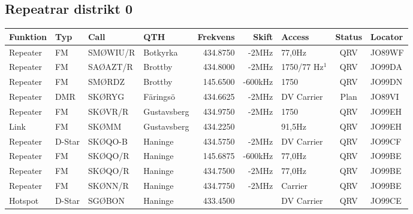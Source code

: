 \documentclass[10pt,swedish,a4paper,twoside]{article}
\begin{document}
\begin{landscape}
\section{Repeatrar distrikt 0}
\footnotesize
\begin{longtable}{llllrrlcl}
	\textbf{Funktion} & \textbf{Typ} & \textbf{Call} & \textbf{QTH} & \textbf{Frekvens} & \textbf{Skift} & \textbf{Access} & \textbf{Status} & \textbf{Locator} \\ \hline
	Repeater          & FM           & SMØWIU/R      & Botkyrka     &          434.8750 &          -2MHz & 77,0Hz         &       QRV       & JO89WF           \\
	Repeater          & FM           & SAØAZT/R      & Brottby      &          434.8000 &          -2MHz & 1750/77 Hz$^1$  &       QRV       & JO99DA           \\
	Repeater          & FM           & SMØRDZ        & Brottby      &          145.6500 &        -600kHz & 1750         &       QRV       & JO99DN           \\
	Repeater          & DMR          & SKØRYG        & Färingsö     &          434.6625 &          -2MHz & DV Carrier      &      Plan       & JO89VI           \\
	Repeater          & FM           & SKØVR/R       & Gustavsberg  &          434.9750 &          -2MHz & 1750            &       QRV       & JO99EH           \\
	Link              & FM           & SKØMM         & Gustavsberg  &          434.2250 &                & 91,5Hz         &       QRV       & JO99EH           \\
	Repeater          & D-Star       & SKØQO-B       & Haninge      &          434.5750 &          -2MHz & DV Carrier      &       QRV       & JO99CF           \\
	Repeater          & FM           & SKØQO/R       & Haninge      &          145.6875 &        -600kHz & 77,0Hz         &       QRV       & JO99BE           \\
	Repeater          & FM           & SKØQO/R       & Haninge      &          434.7500 &          -2MHz & 77,0Hz         &       QRV       & JO99BE           \\
	Repeater          & FM           & SKØNN/R       & Haninge      &          434.7750 &          -2MHz & Carrier         &       QRV       & JO99BE           \\
	Hotspot           & D-Star       & SGØBON        & Haninge      &          433.4500 &                & DV Carrier      &       QRV       & JO99CE           \\

\end{longtable}
\end{landscape}
\end{document}
